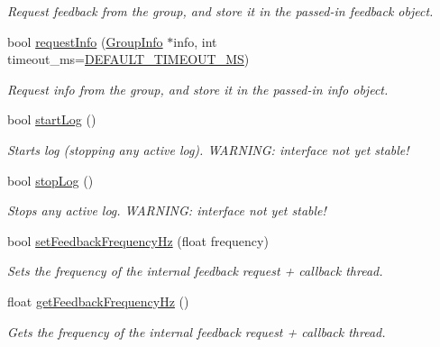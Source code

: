 \begin{DoxyCompactItemize}
\begin{DoxyCompactList}\small\item\em Request feedback from the group, and store it in the passed-\/in feedback object. \end{DoxyCompactList}\item 
bool \hyperlink{classhebi_1_1Group_a1065ad12a649d135758c1b6a95df650e}{request\+Info} (\hyperlink{classhebi_1_1GroupInfo}{Group\+Info} $\ast$info, int timeout\+\_\+ms=\hyperlink{classhebi_1_1Group_a3d01ca6dbd28ec984cda196a77056dd4}{D\+E\+F\+A\+U\+L\+T\+\_\+\+T\+I\+M\+E\+O\+U\+T\+\_\+\+MS})
\begin{DoxyCompactList}\small\item\em Request info from the group, and store it in the passed-\/in info object. \end{DoxyCompactList}\item 
bool \hyperlink{classhebi_1_1Group_ac3760e72c22a47f365e8c23d9a6dcfb7}{start\+Log} ()
\begin{DoxyCompactList}\small\item\em Starts log (stopping any active log). W\+A\+R\+N\+I\+NG\+: interface not yet stable! \end{DoxyCompactList}\item 
bool \hyperlink{classhebi_1_1Group_adbbbbe95f600cb2843c1b51281a74744}{stop\+Log} ()
\begin{DoxyCompactList}\small\item\em Stops any active log. W\+A\+R\+N\+I\+NG\+: interface not yet stable! \end{DoxyCompactList}\item 
bool \hyperlink{classhebi_1_1Group_a4c2dce41b42dc0d318e220098c4d05e4}{set\+Feedback\+Frequency\+Hz} (float frequency)
\begin{DoxyCompactList}\small\item\em Sets the frequency of the internal feedback request + callback thread. \end{DoxyCompactList}\item 
float \hyperlink{classhebi_1_1Group_a5f8e63952136f4d0fc3b847c838985b9}{get\+Feedback\+Frequency\+Hz} ()
\begin{DoxyCompactList}\small\item\em Gets the frequency of the internal feedback request + callback thread. \end{DoxyCompactList}\item 
\mbox{\label{classhebi_1_1Group_a9b428b5d5cf774f0dddc3b50b5daf90e}} 

\end{DoxyCompactItemize}
